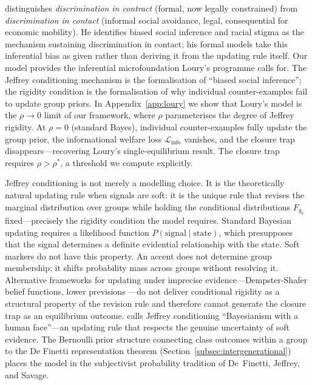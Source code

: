 \documentclass[12pt,a4paper]{article}
\theoremstyle{definition}
\numberwithin{proposition}{subsection}
\begin{document}
\citet{Loury2002} distinguishes \emph{discrimination in contract}
(formal, now legally constrained) from \emph{discrimination in
contact} (informal social avoidance, legal, consequential for
economic mobility). He identifies biased social inference and racial
stigma as the mechanism sustaining discrimination in contact; his
formal models take this inferential bias as given rather than
deriving it from the updating rule itself. Our model provides the
inferential microfoundation Loury's programme calls for. The Jeffrey
conditioning mechanism is the formalisation of ``biased social
inference''; the rigidity condition is the formalisation of why
individual counter-examples fail to update group priors. In
Appendix~\ref{app:loury} we show that Loury's model is the
$\rho \to 0$ limit of our framework, where $\rho$ parameterises
the degree of Jeffrey rigidity. At $\rho = 0$ (standard Bayes),
individual counter-examples fully update the group prior, the
informational welfare loss $\mathcal{L}_{\text{info}}$ vanishes, and
the closure trap disappears---recovering Loury's single-equilibrium
result. The closure trap requires $\rho > \rho^*$, a threshold we
compute explicitly.

Jeffrey conditioning is not merely a modelling choice. It is the
theoretically natural updating rule when signals are soft: it is the
unique rule that revises the marginal distribution over groups while
holding the conditional distributions $F_{g_k}$ fixed---precisely
the rigidity condition the model requires. Standard Bayesian updating
requires a likelihood function
$P(\text{signal} \mid \text{state})$, which presupposes that the
signal determines a definite evidential relationship with the state.
Soft markers do not have this property. An accent does not determine
group membership; it shifts probability mass across groups without
resolving it. Alternative frameworks for updating under imprecise
evidence---Dempster-Shafer belief functions, lower previsions
\citep[see][]{Walley1991}---do not deliver conditional rigidity as a
structural property of the revision rule and therefore cannot generate
the closure trap as an equilibrium outcome. \citet{Jeffrey1983} calls
Jeffrey conditioning ``Bayesianism with a human face''---an updating
rule that respects the genuine uncertainty of soft evidence. The
Bernoulli prior structure connecting class outcomes within a group to
the De Finetti representation theorem
(Section~\ref{subsec:intergenerational}) places the model in the
subjectivist probability tradition of De~Finetti, Jeffrey, and Savage.
\end{document}
